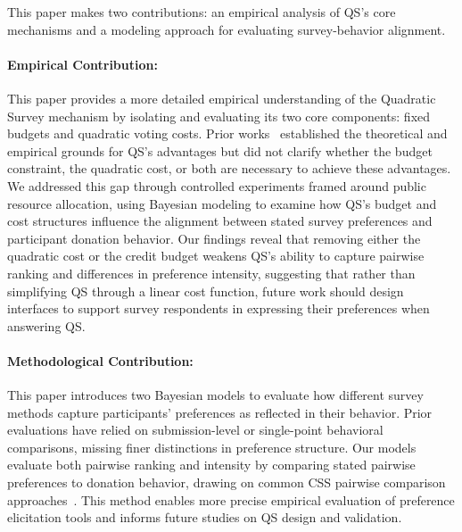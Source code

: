 This paper makes two contributions: an empirical analysis of QS's core mechanisms and a modeling approach for evaluating survey-behavior alignment.

\paragraph{Empirical Contribution: } 
This paper provides a more detailed empirical understanding of the Quadratic Survey mechanism by isolating and evaluating its two core components: fixed budgets and quadratic voting costs. Prior works~\cite{georgescuFixedbudgetMultipleissueQuadratic2024, eguia2019quadratic, quarfoot2017quadratic, chengCanShowWhat2021} established the theoretical and empirical grounds for QS's advantages but did not clarify whether the budget constraint, the quadratic cost, or both are necessary to achieve these advantages. We addressed this gap through controlled experiments framed around public resource allocation, using Bayesian modeling to examine how QS's budget and cost structures influence the alignment between stated survey preferences and participant donation behavior. Our findings reveal that removing either the quadratic cost or the credit budget weakens QS's ability to capture pairwise ranking and differences in preference intensity, suggesting that rather than simplifying QS through a linear cost function, future work should design interfaces to support survey respondents in expressing their preferences when answering QS.

\paragraph{Methodological Contribution:}
This paper introduces two Bayesian models to evaluate how different survey methods capture participants' preferences as reflected in their behavior. Prior evaluations have relied on submission-level or single-point behavioral comparisons, missing finer distinctions in preference structure. Our models evaluate both pairwise ranking and intensity by comparing stated pairwise preferences to donation behavior, drawing on common CSS pairwise comparison approaches~\cite{collewet2023preference, hauserIntensityMeasuresConsumer1980a}. This method enables more precise empirical evaluation of preference elicitation tools and informs future studies on QS design and validation.



